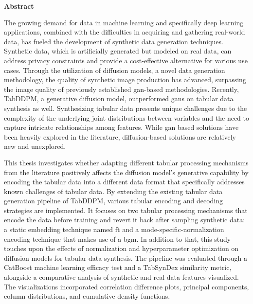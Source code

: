 \thispagestyle{empty}
\begin{center}
	\textbf{\LARGE Abstract}
\end{center}
The growing demand for data in machine learning and specifically deep learning applications, combined with the difficulties in acquiring and gathering real-world data, has fueled the development of synthetic data generation techniques.
Synthetic data, which is artificially generated but modeled on real data, can address privacy constraints and provide a cost-effective alternative for various use cases.
Through the utilization of diffusion models, a novel data generation methodology, the quality of synthetic image production has advanced, surpassing the image quality of previously established \gls{gan}-based methodologies.
Recently, TabDDPM, a generative diffusion model, outperformed \glspl{gan} on tabular data synthesis as well.
Synthesizing tabular data presents unique challenges due to the complexity of the underlying joint distributions between variables and the need to capture intricate relationships among features.
While \gls{gan} based solutions have been heavily explored in the literature, diffusion-based solutions are relatively new and unexplored.


This thesis investigates whether adapting different tabular processing mechanisms from the literature positively affects the diffusion model's generative capability by encoding the tabular data into a different data format that specifically addresses known challenges of tabular data.
By extending the existing tabular data generation pipeline of TabDDPM, various tabular encoding and decoding strategies are implemented.
It focuses on two tabular processing mechanisms that encode the data before training and revert it back after sampling synthetic data: a static embedding technique named \gls{ft} and a mode-specific-normalization encoding technique that makes use of a \gls{bgm}.
In addition to that, this study touches upon the effects of normalization and hyperparameter optimization on diffusion models for tabular data synthesis.
The pipeline was evaluated through a CatBoost machine learning efficacy test and a TabSynDex similarity metric, alongside a comparative analysis of synthetic and real data features visualized. 
The visualizations incorporated correlation difference plots, principal components, column distributions, and cumulative density functions.


